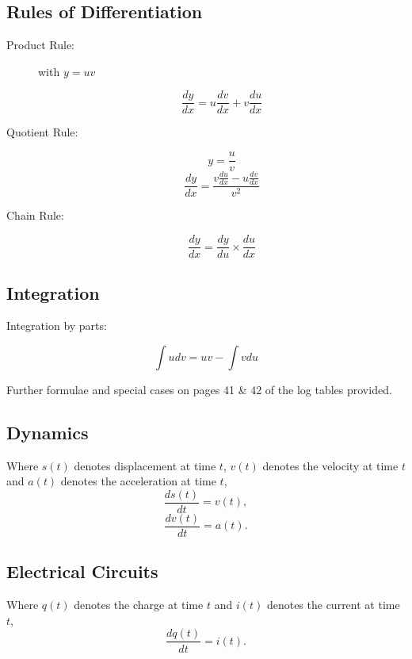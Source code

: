 ﻿ \documentclass[a4paper,12pt]{article}
\begin{document}
	\subsection*{Rules of Differentiation}
\begin{description}
\item[Product Rule:]  with $y = uv$
	
	
	\[ \frac{dy}{dx} = u \frac{dv}{dx} +  v \frac{du}{dx} \]
	
\item[Quotient Rule:] \[ y = \frac{u}{v}\]
	\[ \frac{dy}{dx}  = \frac{v \frac{du}{dx} - u \frac{dv}{dx} }{v^2} \]
	
	
	
\item[Chain Rule:]
	
	\[ \frac{dy}{dx} = \frac{dy}{du} \times \frac{du}{dx}  \]
\end{description}
	
	\subsection*{Integration}
	
	Integration by parts: 
	
	\[ \int u dv = uv - \int v du \]  
	
	Further formulae and special cases on pages 41 \& 42 of the log tables provided.

\subsection*{Dynamics}
Where $s(t)$ denotes displacement at time $t$, $v(t)$ denotes the velocity at time $t$ and $a(t)$
denotes the acceleration at time $t$, 
\[  \frac{ds(t)}{dt}  = v(t),\]
\[  \frac{dv(t)}{dt}  = a(t).\]

\subsection*{Electrical Circuits}
Where $q(t)$ denotes the charge at time $t$ and $i(t)$ denotes the current at time $t$,
\[  \frac{dq(t)}{dt}  = i(t).\]
\end{document}
